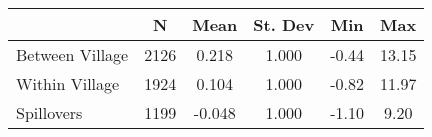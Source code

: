 \begin{tabular}{l*{5}{c}}\hline&\multicolumn{1}{c}{N}&\multicolumn{1}{c}{Mean}&\multicolumn{1}{c}{St. Dev}&\multicolumn{1}{c}{Min}&\multicolumn{1}{c}{Max}\\ \hline 
Between Village & 2126 & 0.218 & 1.000 & -0.44 & 13.15 \\
Within Village & 1924 & 0.104 & 1.000 & -0.82 & 11.97 \\
Spillovers & 1199 & -0.048 & 1.000 & -1.10 & 9.20 \\
\hline \end{tabular}
